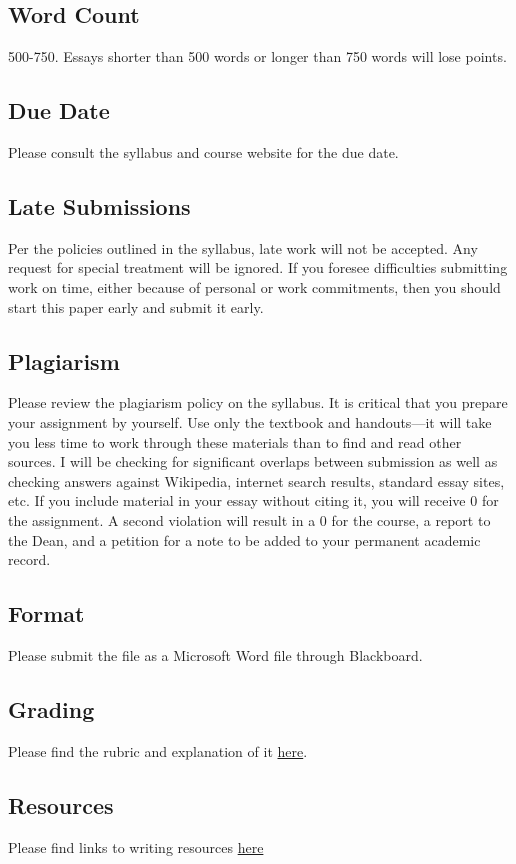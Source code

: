 \documentclass[]{article}
\begin{document}
\subsection{Word Count}\label{word-count}

500-750. Essays shorter than 500 words or longer than 750 words will
lose points.

\subsection{Due Date}\label{due-date}

Please consult the syllabus and course website for the due date.

\subsection{Late Submissions}\label{late-submissions}

Per the policies outlined in the syllabus, late work will not be
accepted. Any request for special treatment will be ignored. If you
foresee difficulties submitting work on time, either because of personal
or work commitments, then you should start this paper early and submit
it early.

\subsection{Plagiarism}\label{plagiarism}

Please review the plagiarism policy on the syllabus. It is critical that
you prepare your assignment by yourself. Use only the textbook and
handouts---it will take you less time to work through these materials
than to find and read other sources. I will be checking for significant
overlaps between submission as well as checking answers against
Wikipedia, internet search results, standard essay sites, etc. If you
include material in your essay without citing it, you will receive 0 for
the assignment. A second violation will result in a 0 for the course, a
report to the Dean, and a petition for a note to be added to your
permanent academic record.

\subsection{Format}\label{format}

Please submit the file as a Microsoft Word file through Blackboard.

\subsection{Grading}\label{grading}

Please find the rubric and explanation of it
\href{/Teaching/Grading/}{here}.

\subsection{Resources}\label{resources}

Please find links to writing resources \href{/Teaching/Resources/}{here}
\end{document}
